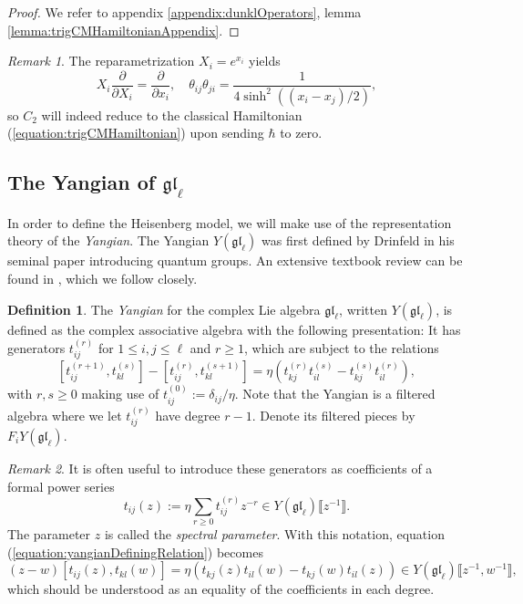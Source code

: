 \documentclass[11pt]{report}
\theoremstyle{definition}
\newtheorem{definition}[theorem]{Definition}
\theoremstyle{remark}
\newtheorem*{remark}{Remark}
\theoremstyle{remark}
\begin{document}
\begin{proof}
We refer to appendix \ref{appendix:dunklOperators}, lemma \ref{lemma:trigCMHamiltonianAppendix}.
\end{proof}

\begin{remark}
The reparametrization $X_i = e^{x_i}$ yields
\begin{equation*}
X_i \frac{\partial}{\partial X_i} = \frac{\partial}{\partial x_i}, \quad \theta_{ij} \theta_{ji} = \frac{1}{4\sinh^2((x_i-x_j)/2)},
\end{equation*}
so $C_2$ will indeed reduce to the classical Hamiltonian (\ref{equation:trigCMHamiltonian}) upon sending $\hbar$ to zero.
\end{remark}

\subsection{The Yangian of $\mathfrak{gl}_\ell$}

In order to define the Heisenberg model, we will make use of the representation theory of the \emph{Yangian}. The Yangian $Y(\mathfrak{gl}_\ell)$ was first defined by Drinfeld in his seminal paper \cite{article:drinfeld:1985} introducing quantum groups. An extensive textbook review can be found in \cite{book:molev}, which we follow closely.

\begin{definition}
The \emph{Yangian} for the complex Lie algebra $\mathfrak{gl}_\ell$, written $Y(\mathfrak{gl}_\ell)$, is defined as the complex associative algebra with the following presentation: It has generators $t_{ij}^{(r)}$ for $1 \leq i,j \leq \ell$ and $r \geq 1$, which are subject to the relations
\begin{equation}\label{equation:yangianDefiningRelation}
[t_{ij}^{(r+1)},t_{kl}^{(s)}] - [t_{ij}^{(r)},t_{kl}^{(s+1)}] = \eta(t_{kj}^{(r)} t_{il}^{(s)} - t_{kj}^{(s)} t_{il}^{(r)}),
\end{equation}
with $r,s \geq 0$ making use of $t_{ij}^{(0)} := \delta_{ij}/\eta$. Note that the Yangian is a filtered algebra where we let $t_{ij}^{(r)}$ have degree $r-1$. Denote its filtered pieces by $F_i Y(\mathfrak{gl}_\ell)$.
\end{definition}

\begin{remark}
It is often useful to introduce these generators as coefficients of a formal power series
\begin{equation*}
t_{ij}(z) := \eta \sum_{r \geq 0} t_{ij}^{(r)} z^{-r} \in Y(\mathfrak{gl}_\ell)\llbracket z^{-1} \rrbracket.
\end{equation*}
The parameter $z$ is called the \emph{spectral parameter}. With this notation, equation (\ref{equation:yangianDefiningRelation}) becomes
\begin{equation}\label{equation:yangianDefiningRelationUV}
(z-w) [t_{ij}(z),t_{kl}(w)] = \eta(t_{kj}(z) t_{il}(w) - t_{kj}(w) t_{il}(z)) \in Y(\mathfrak{gl}_\ell)\llbracket z^{-1},w^{-1} \rrbracket,
\end{equation}
which should be understood as an equality of the coefficients in each degree.
\end{remark}
\end{document}
